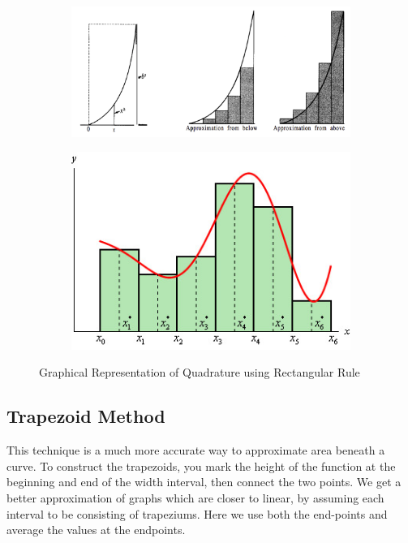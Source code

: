 \documentclass[11pt]{article}
\begin{document}
\begin{figure} [h!]
	\centering
	\begin{subfigure}{0.5\textwidth}
		\centering
		\includegraphics[width=1.1\linewidth]{Sample1}
		\label{fig1:sub1}
	\end{subfigure}%
	\hspace{1cm}
	\begin{subfigure}{0.4\textwidth}
		\centering
		\includegraphics[width=0.9\linewidth]{Sample2}
		\label{fig1:sub2}
	\end{subfigure}
	\caption{Graphical Representation of Quadrature using Rectangular Rule}
\end{figure}

\subsection{Trapezoid Method}
This technique is a much more accurate way to 
approximate area beneath a curve.  To construct the 
trapezoids, you mark the height of the function at the beginning and end of the width interval, then connect the two points.
We get a better approximation of graphs which are closer to linear, by assuming each interval to be consisting of trapeziums. Here we use both the end-points and average the values at the endpoints.\\
\end{document}
